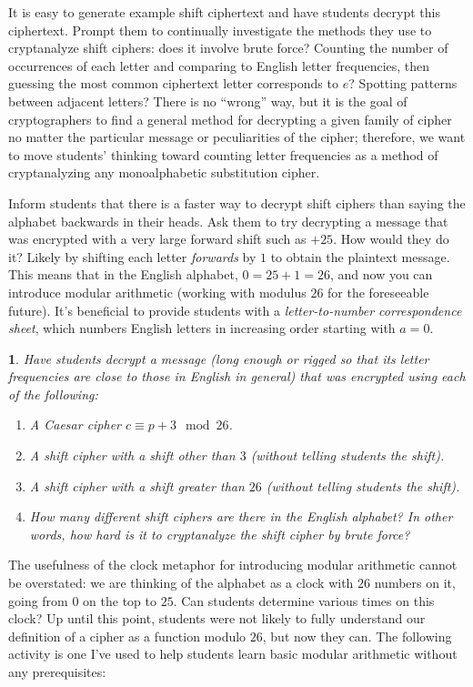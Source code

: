 \documentclass[11pt]{article}
\theoremstyle{plain}
\theoremstyle{remark}
\theoremstyle{definition}
\theoremstyle{definition}
\theoremstyle{definition}
\theoremstyle{plain}
\theoremstyle{plain}
\theoremstyle{plain}
\newtheorem{act}[thm]{\protect\activityname}
\theoremstyle{definition}
\providecommand{\activityname}{Activity}
\begin{document}
It is easy to generate example shift ciphertext and have students
decrypt this ciphertext. Prompt them to continually investigate the
methods they use to cryptanalyze shift ciphers: does it involve brute
force? Counting the number of occurrences of each letter and comparing
to English letter frequencies, then guessing the most common ciphertext
letter corresponds to $e$? Spotting patterns between adjacent letters?
There is no ``wrong'' way, but it is the goal of cryptographers to
find a general method for decrypting a given family of cipher no matter
the particular message or peculiarities of the cipher; therefore,
we want to move students' thinking toward counting letter frequencies
as a method of cryptanalyzing any monoalphabetic substitution cipher.

Inform students that there is a faster way to decrypt shift ciphers
than saying the alphabet backwards in their heads. Ask them to try
decrypting a message that was encrypted with a very large forward
shift such as $+25$. How would they do it? Likely by shifting each
letter \textit{forwards} by $1$ to obtain the plaintext message.
This means that in the English alphabet, $0=25+1=26$, and now you
can introduce modular arithmetic (working with modulus $26$ for the
foreseeable future). It's beneficial to provide students with a \textit{letter-to-number
correspondence sheet}, which numbers English letters in increasing
order starting with $a=0$.

\begin{act}
Have students decrypt a message (long enough or rigged so that its letter frequencies are close to those in English in general) 	that was encrypted using each of the following:
	\begin{enumerate}
	\item A Caesar cipher $c\equiv p+3\mod26$.
	\item A shift cipher with a shift other than $3$ (without telling students the shift).
	\item A shift cipher with a shift greater than $26$ (without telling students the shift).
	\item How many different shift ciphers are there in the English alphabet? In other words, how hard is it to cryptanalyze the shift cipher by brute force?
	\end{enumerate}

\end{act}


The usefulness of the clock metaphor for introducing
modular arithmetic cannot be overstated: we are thinking of the alphabet as a clock with
$26$ numbers on it, going from $0$ on the top to $25$. Can students
determine various times on this clock? Up until this point, students
were not likely to fully understand our definition of a cipher as
a function modulo $26$, but now they can. The following activity is one I've used to help students learn basic modular arithmetic without any prerequisites:
\end{document}
